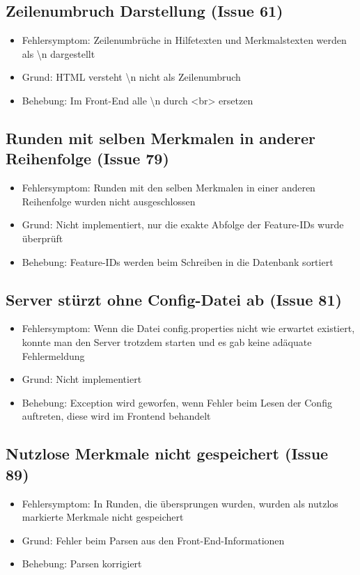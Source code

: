 \documentclass[a4paper]{scrreprt}
\begin{document}
    \subsection{Zeilenumbruch Darstellung (Issue 61)}
    \begin{itemize}
    \item Fehlersymptom: Zeilenumbrüche in Hilfetexten und Merkmalstexten werden als \textbackslash n dargestellt
    \item Grund: HTML versteht \textbackslash n nicht als Zeilenumbruch
    \item Behebung: Im Front-End alle \textbackslash n durch <br> ersetzen
    \end{itemize}

    \subsection{Runden mit selben Merkmalen in anderer Reihenfolge (Issue 79)}
    \begin{itemize}
    \item Fehlersymptom: Runden mit den selben Merkmalen in einer anderen
     Reihenfolge wurden nicht ausgeschlossen
    \item Grund: Nicht implementiert, nur die exakte Abfolge der Feature-IDs wurde
     überprüft
    \item Behebung: Feature-IDs werden beim Schreiben in die Datenbank sortiert
    \end{itemize}

    \subsection{Server stürzt ohne Config-Datei ab (Issue 81)}
    \begin{itemize}
    \item Fehlersymptom: Wenn die Datei config.properties nicht wie erwartet
     existiert, konnte man den Server trotzdem starten und es gab keine
     adäquate Fehlermeldung
    \item Grund: Nicht implementiert
    \item Behebung: Exception wird geworfen, wenn Fehler beim Lesen der Config
     auftreten, diese wird im Frontend behandelt
    \end{itemize}

    \subsection{Nutzlose Merkmale nicht gespeichert (Issue 89)}
    \begin{itemize}
    \item Fehlersymptom: In Runden, die übersprungen wurden, wurden als nutzlos
     markierte Merkmale nicht gespeichert
    \item Grund: Fehler beim Parsen aus den Front-End-Informationen
    \item Behebung: Parsen korrigiert
    \end{itemize}
\end{document}
